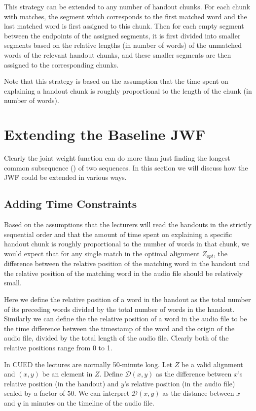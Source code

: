 This strategy can be extended to any number of handout chunks. For each chunk with matches, the segment which corresponds to the first matched word and the last matched word is first assigned to this chunk. Then for each empty segment between the endpoints of the assigned segments, it is first divided into smaller segments based on the relative lengths (in number of words) of the unmatched words of the relevant handout chunks, and these smaller segments are then assigned to the corresponding chunks.

Note that this strategy is based on the assumption that the time spent on explaining a handout chunk is roughly proportional to the length of the chunk (in number of words).


\section{Extending the Baseline JWF}

Clearly the joint weight function can do more than just finding the longest common subsequence () of two sequences. In this section we will discuss how the JWF could be extended in various ways.

\subsection{Adding Time Constraints}

Based on the assumptions that the lecturers will read the handouts in the strictly sequential order and that the amount of time spent on explaining a specific handout chunk is roughly proportional to the number of words in that chunk, we would expect that for any single match in the optimal alignment $Z_{opt}$, the difference between the relative position of the matching word in the handout and the relative position of the matching word in the audio file should be relatively small. 

Here we define the relative position of a word in the handout as the total number of its preceding words divided by the total number of words in the handout. Similarly we can define the the relative position of a word in the audio file to be the time difference between the timestamp of the word and the origin of the audio file, divided by the total length of the audio file. Clearly both of the relative positions range from 0 to 1.

In CUED the lectures are normally 50-minute long. Let $Z$ be a valid alignment and $(x,y)$ be an element in $Z$. Define $\mathcal{D}(x,y)$ as the difference between $x$'s relative position (in the handout) and $y$'s relative position (in the audio file) scaled by a factor of 50. We can interpret $\mathcal{D}(x,y)$ as the distance between $x$ and $y$ in minutes on the timeline of the audio file.

